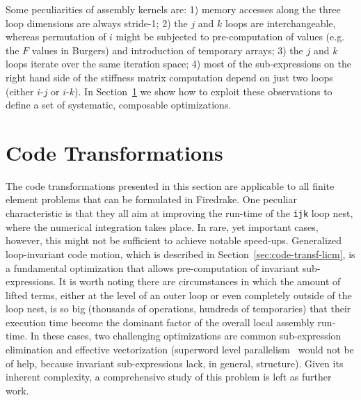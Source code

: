 \documentclass[conference]{IEEEtran}
\begin{document}
Some peculiarities of assembly kernels are: 1) memory accesses along the three loop dimensions are always stride-1; 2) the $j$ and $k$ loops are interchangeable, whereas permutation of $i$ might be subjected to pre-computation of values (e.g. the $F$ values in Burgers) and introduction of temporary arrays; 3) the $j$ and $k$ loops iterate over the same iteration space; 4) most of the sub-expressions on the right hand side of the stiffness matrix computation depend on just two loops (either $i$-$j$ or $i$-$k$). In Section~\ref{sec:code-transf} we show how to exploit these observations to define a set of systematic, composable optimizations.


\section{Code Transformations}
\label{sec:code-transf}
The code transformations presented in this section are applicable to all finite element problems that can be formulated in Firedrake. One peculiar characteristic is that they all aim at improving the run-time of the \texttt{ijk} loop nest, where the numerical integration takes place. In rare, yet important cases, however, this might not be sufficient to achieve notable speed-ups. Generalized loop-invariant code motion, which is described in Section~\ref{sec:code-transf-licm}, is a fundamental optimization that allows pre-computation of invariant sub-expressions. It is worth noting there are circumstances in which the amount of lifted terms, either at the level of an outer loop or even completely outside of the loop nest, is so big (thousands of operations, hundreds of temporaries) that their execution time become the dominant factor of the overall local assembly run-time. In these cases, two challenging optimizations are common sub-expression elimination and effective vectorization (superword level parallelism~\cite{SLP} would not be of help, because invariant sub-expressions lack, in general, structure). Given its inherent complexity, a comprehensive study of this problem is left as further work. 
\end{document}
